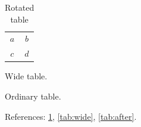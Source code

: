 \documentclass{article}
\begin{document}
\begin{table}
  \begin{tabular}{cc} $a$ & $b$ \\ $c$ & $d$ \end{tabular}
  \caption{Rotated table}\label{tab:rotated}
\end{table}
\begin{table}
  Wide table. \caption{Wide rotated table}\label{tab:wide}
\end{table}
\begin{table}
  Ordinary table. \caption{After rotation}\label{tab:after}
\end{table}
References: \ref{tab:rotated}, \ref{tab:wide}, \ref{tab:after}.
\end{document}
